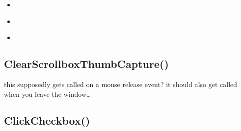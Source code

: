 \documentclass[letterpaper,10pt,english]{sphinxmanual}
\begin{document}
\begin{sphinxShadowBox}
\begin{itemize}
\item {} 
\sphinxAtStartPar
{}\label{\detokenize{reference/ui:id33}}{\hyperref[\detokenize{reference/ui:updatescrollbox}]{}}

\item {} 
\sphinxAtStartPar
{}\label{\detokenize{reference/ui:id34}}{\hyperref[\detokenize{reference/ui:vecplus}]{}}

\item {} 
\sphinxAtStartPar
{}\label{\detokenize{reference/ui:id35}}{\hyperref[\detokenize{reference/ui:adaptivetextbox}]{}}

\end{itemize}
\end{sphinxShadowBox}

\ignorespaces 

\subsection{ClearScrollboxThumbCapture()}
\label{\detokenize{reference/ui:clearscrollboxthumbcapture}}\label{\detokenize{reference/ui:index-0}}
\sphinxAtStartPar
{}

\sphinxAtStartPar
this supposedly gets called on a mouse release event?
it should also get called when you leave the window…

\sphinxAtStartPar
{}

\begin{sphinxVerbatim}[commandchars=\\\{\}]
\end{sphinxVerbatim}

\ignorespaces 

\subsection{ClickCheckbox()}
\label{\detokenize{reference/ui:clickcheckbox}}\label{\detokenize{reference/ui:index-1}}
\sphinxAtStartPar
{}

\sphinxAtStartPar
{}
\end{document}
